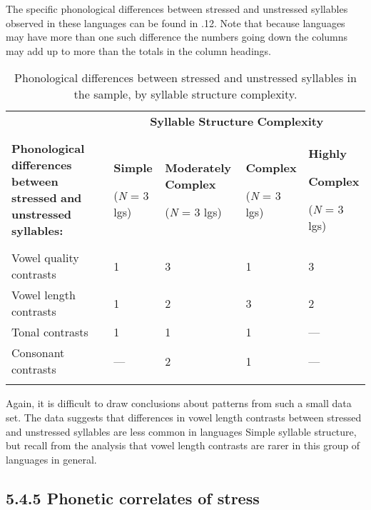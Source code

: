   The specific phonological differences between stressed and unstressed syllables observed in these languages can be found in .12. Note that because languages may have more than one such difference the numbers going down the columns may add up to more than the totals in the column headings.






\begin{table}
\begin{tabularx}{\textwidth}{XXXXX}
\lsptoprule
 & \multicolumn{4}{c}{ \textbf{Syllable} \textbf{Structure} \textbf{Complexity}}\\
 \textbf{Phonological} \textbf{differences} \textbf{between} \textbf{stressed} \textbf{and} \textbf{unstressed} \textbf{syllables:} & { \textbf{Simple}}

 (\textit{N} = 3 lgs) & { \textbf{Moderately} \textbf{Complex}}

 (\textit{N} = 3 lgs) & { \textbf{Complex}}

 (\textit{N} = 3 lgs) & { \textbf{Highly} }

{ \textbf{Complex}}

 (\textit{N} = 3 lgs)\\
 Vowel quality contrasts & 1 & 3 & 1 & 3\\
 Vowel length contrasts & 1 & 2 & 3 & 2\\
 Tonal contrasts & 1 & 1 & 1 & —\\
 Consonant contrasts & — & 2 & 1 & —\\
\lspbottomrule
\end{tabularx}
\caption{\label{5.12}Phonological differences between stressed and unstressed syllables in the sample, by syllable structure complexity.}
\end{table}




  Again, it is difficult to draw conclusions about patterns from such a small data set. The data suggests that differences in vowel length contrasts between stressed and unstressed syllables are less common in languages Simple syllable structure, but recall from the analysis  that vowel length contrasts are rarer in this group of languages in general.


\subsection{5.4.5 Phonetic correlates of stress}

